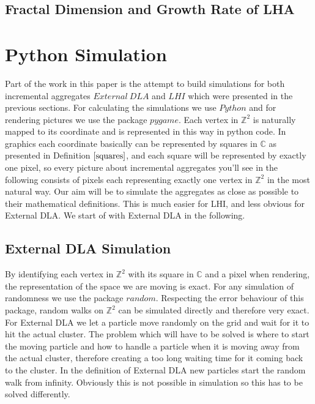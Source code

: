 \documentclass[12pt,a4paper]{scrartcl}
\numberwithin{equation}{subsection}
\newcommand{\C}{\mathbb{C}} %
\newcommand{\Z}{\mathbb{Z}} %
\newcommand{\1}{\mathbbm{1}}
\numberwithin{equation}{section}
\theoremstyle{definition}
\begin{document}
\subsection{Fractal Dimension and Growth Rate of LHA}



\newpage
\section{Python Simulation}
Part of the work in this paper is the attempt to build simulations for both incremental aggregates $\mathit{External\ DLA}$ and $\mathit{LHI}$ which were presented in the previous sections. For calculating the simulations we use $\mathit{Python}$ and for rendering pictures we use the package $\mathit{pygame}$. Each vertex in $\Z^2$ is naturally mapped to its coordinate and is represented in this way in python code. In graphics each coordinate basically can be represented by squares in $\C$ as presented in Definition $\ref{squares}$, and each square will be represented by exactly one pixel, so every picture about incremental aggregates you'll see in the following consists of pixels each representing exactly one vertex in $\Z^2$ in the most natural way. Our aim will be to simulate the aggregates as close as possible to their mathematical definitions. This is much easier for LHI, and less obvious for External DLA. We start of with External DLA in the following.

\subsection{External DLA Simulation}

By identifying each vertex in $\Z^2$ with its square in $\C$ and a pixel when rendering, the representation of the space we are moving is exact. For any simulation of randomness we use the package $\mathit{random}$. Respecting the error behaviour of this package, random walks on $\Z^2$ can be simulated directly and therefore very exact. For External DLA we let a particle move randomly on the grid and wait for it to hit the actual cluster. The problem which will have to be solved is where to start the moving particle and how to handle a particle when it is moving away from the actual cluster, therefore creating a too long waiting time for it coming back to the cluster. In the definition of External DLA new particles start the random walk from infinity. Obviously this is not possible in simulation so this has to be solved differently. 
\end{document}
